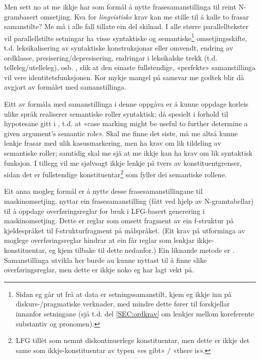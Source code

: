 \documentclass[12pt,a4paper,oneside,draft]{report}
\begin{document}
Men sett no at me ikkje har som formål å nytte frasesamanstillinga til
 reint N-grambasert omsetjing. Kva for \emph{lingvistiske} krav kan me
 stille til å kalle to frasar samanstilte? Me må i alle fall tillate
 ein del skilnad.  I alle større parallelltekster vil parallellstilte
 setningar ha visse syntaktiske og semantiske\footnote{Sidan eg går ut frå at data er setningssamanstilt, kjem eg
       ikkje inn på diskurs-/pragmatiske verknader, med mindre dette
       fører til forskjellar innanfor setningane (sjå t.d. del
       \ref{SEC:ordkrav} om lenkjer mellom koreferente substantiv og
       pronomen). } omsetjingsskifte,
 t.d. leksikalisering av syntaktiske konstruksjonar eller omvendt,
 endring av ordklasse, presisering/depresisering, endringar i
 leksikalske trekk (t.d. telleleg/utelleleg),
 osb. \citep[s.~56--62]{munday2001its}, slik at den einaste
 fullstendige, «perfekte» samanstillinga vil vere
 identitetsfunksjonen. Kor mykje mangel på samsvar me godtek blir då
 avgjort av formålet med samanstillinga.

Eitt av formåla med samanstillinga i denne oppgåva er å kunne oppdage
 korleis ulike språk realiserer semantiske roller syntaktisk; då
 spesielt i forhold til hypotesane gitt i \citet[s.~7]{xpar2008rcn},
 t.d. at «case marking might be useful to further determine a given
 argument's semantic role». Skal me finne det siste, må me altså kunne
 lenkje frasar med ulik kasusmarkering, men ha krav om lik tildeling
 av semantiske roller; samtidig skal me sjå at me ikkje kan ha krav om
 lik syntaktisk funksjon. I tillegg vil me sjølvsagt ikkje lenkje på
 tvers av konstituentgrenser, sidan det er fullstendige
 konstituentar\footnote{LFG tillèt som nemnt diskontinuerlege konstituentar, men dette
        er ikkje det same som ikkje-konstituentar av typen «es gibt» /
        «there is». } som fyller dei semantiske rollene.

Eit anna mogleg formål er å nytte desse frasesamanstillingane til
 maskinomsetjing. \citet{riezler2006gmt} nyttar ein frasesamanstilling
 (fått ved hjelp av N-gramtabellar) til å oppdage overføringsreglar
 for bruk i LFG-basert generering i maskinomsetjing. Dette er reglar
 som omsett fragment av ein f\hyp{}struktur på kjeldespråket til
 f\hyp{}strukturfragment på målspråket. (Eit krav på utforminga av moglege
 overføringsreglar hindrar at ein får reglar som lenkjar
 ikkje-konstituentar, eg kjem tilbake til dette nedanfor.) Ein
 liknande metode er \citet{graham2010dsl,graham2009fts}.
 Samanstillinga utvikla her burde au kunne nyttast til å finne slike
 overføringsreglar, men dette er ikkje noko eg har lagt vekt på.
\end{document}
